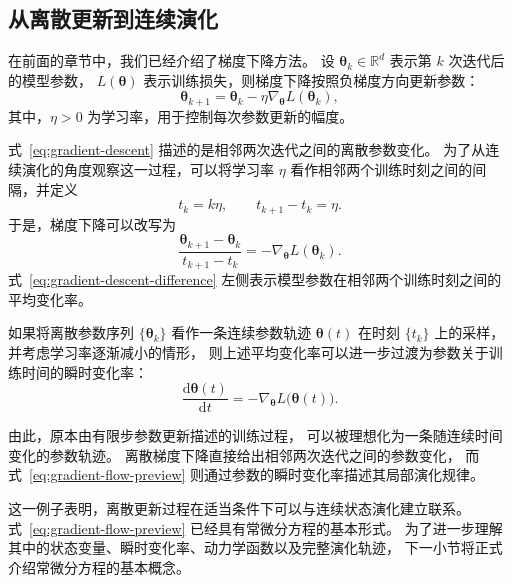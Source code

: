 \documentclass[UTF8,a4paper,zihao=-4,oneside,openany]{ctexbook}
\begin{document}
\subsection{从离散更新到连续演化}
\label{subsec:discrete-to-continuous-evolution}

在前面的章节中，我们已经介绍了梯度下降方法。
设
\(\boldsymbol{\theta}_k\in\mathbb{R}^{d}\)
表示第 \(k\) 次迭代后的模型参数，
\(L(\boldsymbol{\theta})\)
表示训练损失，则梯度下降按照负梯度方向更新参数：
\begin{equation}
    \boldsymbol{\theta}_{k+1}
    =
    \boldsymbol{\theta}_k
    -
    \eta
    \nabla_{\boldsymbol{\theta}}
    L(\boldsymbol{\theta}_k),
    \label{eq:gradient-descent}
\end{equation}
其中，\(\eta>0\) 为学习率，用于控制每次参数更新的幅度。

式~\eqref{eq:gradient-descent} 描述的是相邻两次迭代之间的离散参数变化。
为了从连续演化的角度观察这一过程，可以将学习率 \(\eta\)
看作相邻两个训练时刻之间的间隔，并定义
\begin{equation}
    t_k=k\eta,
    \qquad
    t_{k+1}-t_k=\eta.
    \label{eq:training-time}
\end{equation}
于是，梯度下降可以改写为
\begin{equation}
    \frac{
        \boldsymbol{\theta}_{k+1}
        -
        \boldsymbol{\theta}_k
    }{
        t_{k+1}-t_k
    }
    =
    -
    \nabla_{\boldsymbol{\theta}}
    L(\boldsymbol{\theta}_k).
    \label{eq:gradient-descent-difference}
\end{equation}
式~\eqref{eq:gradient-descent-difference} 左侧表示模型参数在相邻两个训练时刻之间的
平均变化率。

如果将离散参数序列
\(\{\boldsymbol{\theta}_k\}\)
看作一条连续参数轨迹
\(\boldsymbol{\theta}(t)\)
在时刻 \(\{t_k\}\) 上的采样，并考虑学习率逐渐减小的情形，
则上述平均变化率可以进一步过渡为参数关于训练时间的瞬时变化率：
\begin{equation}
    \frac{
        \mathrm{d}\boldsymbol{\theta}(t)
    }{
        \mathrm{d}t
    }
    =
    -
    \nabla_{\boldsymbol{\theta}}
    L\bigl(\boldsymbol{\theta}(t)\bigr).
    \label{eq:gradient-flow-preview}
\end{equation}

由此，原本由有限步参数更新描述的训练过程，
可以被理想化为一条随连续时间变化的参数轨迹。
离散梯度下降直接给出相邻两次迭代之间的参数变化，
而式~\eqref{eq:gradient-flow-preview}
则通过参数的瞬时变化率描述其局部演化规律。

这一例子表明，离散更新过程在适当条件下可以与连续状态演化建立联系。
式~\eqref{eq:gradient-flow-preview}
已经具有常微分方程的基本形式。
为了进一步理解其中的状态变量、瞬时变化率、动力学函数以及完整演化轨迹，
下一小节将正式介绍常微分方程的基本概念。
\end{document}
